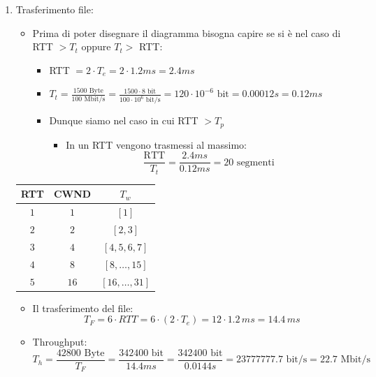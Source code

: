 \documentclass[10pt,a4paper]{article}
\newcommand{\lightrule}{%
	\arrayrulecolor{black!30}%
	\midrule[\lightrulewidth]%
	\arrayrulecolor{black}}
\begin{document}
\begin{enumerate}
\begin{itemize}
			\end{itemize}
		\item Trasferimento file:
			\begin{itemize}
				\item Prima di poter disegnare il diagramma bisogna capire se si è nel caso di RTT $> T_t$ oppure $T_t > $ RTT:
				\begin{itemize}
					\item RTT $= 2 \cdot T_e = 2 \cdot 1.2 ms = 2.4ms$
					\item $T_t = \displaystyle{ \frac{1500 \textrm{ Byte}}{100 \textrm{ Mbit/s}}} =\displaystyle{ \frac{1500 \cdot 8 \textrm{ bit}}{100 \cdot 10^6 \textrm{ bit/s}}} = 120 \cdot 10^{-6} \textrm{ bit} = 0.00012 s = 0.12 ms$ 
					\item Dunque siamo nel caso in cui RTT $> T_p$
						\begin{itemize}
							\item In un RTT vengono trasmessi al massimo: $$\frac{\textrm{RTT}}{T_t} = \frac{2.4 ms}{0.12 ms} = 20 \textrm{ segmenti}$$
						\end{itemize}
				\end{itemize}
			\end{itemize}
			\begin{center}
				\centering
 				\begin{tabular}{@{} *{3}{c} @{}}
					\toprule
						\textbf{RTT} & \textbf{CWND} & \textbf{$T_w$} \\
					\midrule
						$1$ & $1$ & $[1]$ \\ 
					\lightrule
						$2$ & $2$ & $[2,3]$ \\
					\lightrule
						$3$ & $4$ & $[4,5,6,7]$ \\ 				
					\lightrule
						$4$ & $8$ & $[8,\dots,15]$ \\
					\lightrule
						$5$ & $16$ & $[16,\dots,31]$ \\
					\bottomrule
				\end{tabular}
			\end{center}
			\begin{itemize}
				\item Il trasferimento del file: $$T_{F} = 6 \cdot RTT = 6 \cdot (2 \cdot T_e) = 12 \cdot 1.2 \,ms = 14.4 \,ms$$
				\item Throughput: $$T_h = \displaystyle{\frac{42800 \textrm{ Byte}}{T_F} = \frac{342400 \textrm{ bit}}{14.4 ms} = \frac{342400 \textrm{ bit}}{0.0144 s} = 23777777.7 \textrm{ bit/s} = 22.7 \textrm{ Mbit/s}}$$
			\end{itemize}

\end{enumerate}
\end{document}
